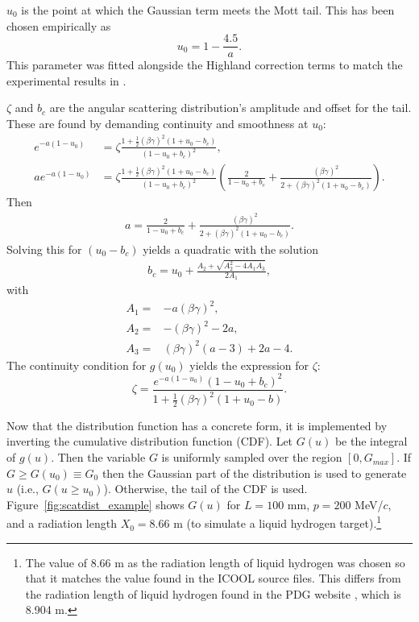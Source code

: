 $u_0$ is the point at which the Gaussian term meets the Mott tail. This has been chosen empirically as
\begin{equation}\label{eqn:cosyu0}
u_0=1-\frac{4.5}{a}.
\end{equation}
This parameter was fitted alongside the Highland correction terms to match the experimental results in \cite{muscat}.

$\zeta$ and $b_c$ are the angular scattering distribution's amplitude and offset for the tail. These are found by demanding continuity and smoothness at $u_0$:
\begin{align*}
e^{-a(1-u_0)}&=\zeta\frac{1+\frac{1}{2}(\beta\gamma)^2(1+u_0-b_c)}{(1-u_0+b_c)^2},\\
ae^{-a(1-u_0)}&=\zeta\frac{1+\frac{1}{2}(\beta\gamma)^2(1+u_0-b_c)}{(1-u_0+b_c)^2} \left(\frac{2}{1-u_0+b_c}+\frac{(\beta\gamma)^2}{2+(\beta\gamma)^2(1+u_0-b_c)}\right).
\end{align*}
Then
\begin{align*}
a=\frac{2}{1-u_0+b_c}+\frac{(\beta\gamma)^2}{2+(\beta\gamma)^2(1+u_0-b_c)}.
\end{align*}
Solving this for $(u_0-b_c)$ yields a quadratic with the solution
\begin{align} \label{eqn:cosybc}
b_c=u_0+\frac{A_2 + \sqrt{A_2 ^2 - 4A_1 A_3}}{2A_1},
\end{align}
with
\begin{align*}
A_1=&-a(\beta\gamma)^2,\\
A_2=&-(\beta\gamma)^2-2a,\\
A_3=&(\beta\gamma)^2(a-3)+2a-4.
\end{align*}
The continuity condition for $g(u_0)$ yields the expression for $\zeta$:
\begin{equation}\label{eqn:cosyzeta}
\zeta=\frac{e^{-a(1-u_0)}(1-u_0+b_c)^2}{1+\frac{1}{2}(\beta\gamma)^2(1+u_0-b)}.
\end{equation}

Now that the distribution function has a concrete form, it is implemented by inverting the cumulative distribution function (CDF).  Let $G(u)$ be the integral of $g(u)$. Then the variable $G$ is uniformly sampled over the region $[0,G_{max}]$. If $G\geq G(u_0) \equiv G_0$ then the Gaussian part of the distribution is used to generate $u$ (i.e., $G(u\geq u_0)$). Otherwise, the tail of the CDF is used. Figure~\ref{fig:scatdist_example} shows $G(u)$ for $L=100$ mm, $p=200$ MeV/$c$, and a radiation length $X_0 = 8.66$ m (to simulate a liquid hydrogen target).\footnote{The value of 8.66 m as the radiation length of liquid hydrogen was chosen so that it matches the value found in the ICOOL source files. This differs from the radiation length of liquid hydrogen found in the PDG website \cite{PDG}, which is 8.904 m.}

